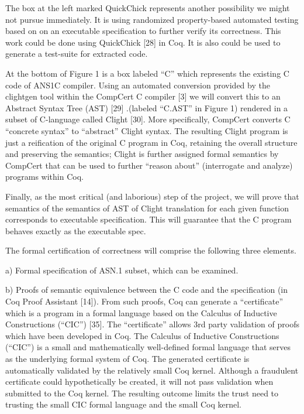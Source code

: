 \documentclass[acmsmall,nonacm]{acmart}
\begin{document}
The box at the left marked QuickChick represents another possibility we might not pursue immediately. It is using randomized property-based automated testing based on on an executable specification to further verify its correctness. This work could be done using  QuickChick [28] in Coq. It is also could be used to generate a test-suite for extracted code.

At the bottom of Figure 1 is a box labeled ``C'' which represents the existing C code of ANS1C compiler. Using an automated conversion provided by the clightgen tool within the CompCert C compiler [3] we will convert this to an Abstract Syntax Tree (AST) [29] .(labeled ``C.AST'' in Figure 1) rendered in a subset of C-language called Clight [30]. More specifically, CompCert converts C ``concrete syntax'' to ``abstract'' Clight syntax. The resulting Clight program is just a reification of the original C program in Coq, retaining the overall structure and preserving the semantics; Clight is further assigned formal semantics by CompCert that can be used to further ``reason about'' (interrogate and analyze) programs within  Coq.

Finally, as the most critical (and laborious) step of the project, we will prove that semantics of the semantics of AST of Clight translation for each given function corresponds to executable specification. This will guarantee that the C program behaves exactly as the executable spec.

The formal certification of correctness will comprise the following three elements.

a) Formal specification of ASN.1 subset, which can be examined. 

b) Proofs of semantic equivalence between the C code and the specification (in Coq Proof Assistant [14]). From such proofs, Coq can generate a ``certificate''  which is a program in a formal language based on the Calculus of Inductive Constructions (``CIC'') [35]. The ``certificate'' allows 3rd party validation of proofs which have been developed in Coq. The Calculus of Inductive Constructions (``CIC'') is a small and mathematically well-defined formal language that serves as the underlying formal system of Coq. The generated certificate is automatically validated by the relatively small Coq kernel. Although a fraudulent certificate could hypothetically be created, it will not pass validation when submitted to the Coq kernel. The resulting outcome limits the trust need to trusting the small CIC formal language and the small Coq kernel. 
\end{document}
